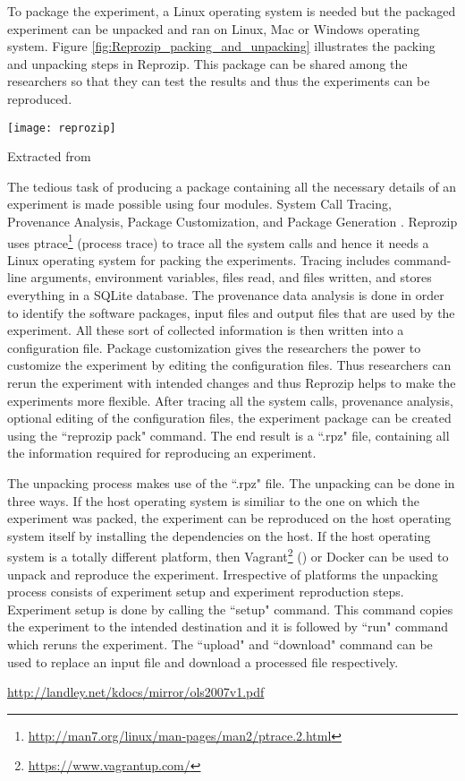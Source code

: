 To package the experiment, a Linux operating system is needed but the packaged experiment can be unpacked and ran on Linux, Mac or Windows operating system. Figure \ref{fig:Reprozip_packing_and_unpacking} illustrates the packing and unpacking steps in Reprozip. This package can be shared among the researchers so that they can test the results and thus the experiments can be reproduced.

\begin{center}
\texttt{[image: reprozip]}
\label{fig:Reprozip_packing_and_unpacking}
\caption*{Extracted from \cite{Rampin2016}}
\end{center}

The tedious task of producing a package containing all the necessary details of an experiment is made possible using four modules. System Call Tracing, Provenance Analysis, Package Customization, and Package Generation \cite{Chirigati:2013:RUP:2482613.2482614}. Reprozip uses ptrace\footnote{\url{http://man7.org/linux/man-pages/man2/ptrace.2.html}} (process trace) to trace all the system calls and hence it needs a Linux operating system for packing the experiments. Tracing includes command-line arguments, environment variables, files read, and files written, and stores everything in a SQLite database. The provenance data analysis is done in order to identify the software packages, input files and output files that are used by the experiment. All these sort of collected information is then written into a configuration file. Package customization gives the researchers the power to customize the experiment by editing the configuration files. Thus researchers can rerun the experiment with intended changes and thus Reprozip helps to make the experiments more flexible. After tracing all the system calls, provenance analysis, optional editing of the configuration files, the experiment package can be created using the ``reprozip pack" command. The end result is a ``.rpz" file, containing all the information required for reproducing an experiment.

The unpacking process makes use of the ``.rpz" file. The unpacking can be done in three ways. If the host operating system is similiar to the one on which the experiment was packed, the experiment can be reproduced on the host operating system itself by installing the dependencies on the host. If the host operating system is a totally different platform, then Vagrant\footnote{\url{https://www.vagrantup.com/}} () or Docker can be used to unpack and reproduce the experiment. Irrespective of platforms the unpacking process consists of experiment setup and experiment reproduction steps. Experiment setup is done by calling the ``setup" command. This command copies the experiment to the intended destination and it is followed by ``run" command which reruns the experiment. The ``upload" and ``download" command can be used to replace an input file and download a processed file respectively.

\hyperref[System Call Interception]{http://landley.net/kdocs/mirror/ols2007v1.pdf}
